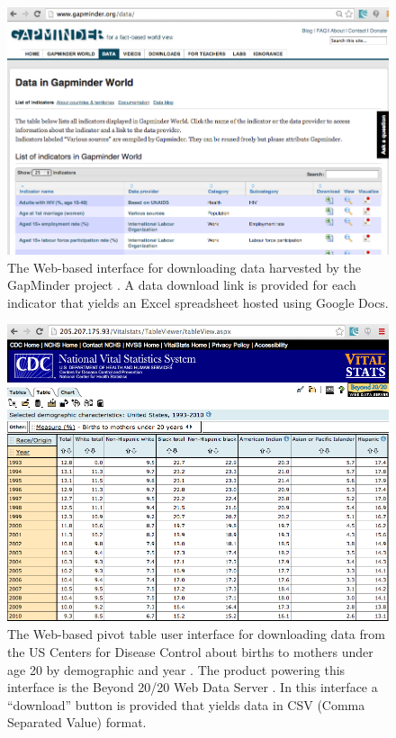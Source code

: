 \begin{figure}[h!]
  \centering
  \includegraphics[width=\figureWidth]{figs/gapminderData.png}
  \caption[GapMinder Data Access User Interface.]
    {The Web-based interface for downloading data harvested by the GapMinder project \cite{gapminderData}. A data download link is provided for each indicator that yields an Excel spreadsheet hosted using Google Docs.}
  \label{fig:gapminderData}
\end{figure}

\begin{figure}[h!]
  \centering
  \includegraphics[width=\figureWidth]{figs/CDCVitalStatsUI.png}
  \caption[CDC Vital Statistics User Interface.]
    {The Web-based pivot table user interface for downloading data from the US Centers for Disease Control about births to mothers under age 20 by demographic and year \cite{CDCVitalStatsUI}. The product powering this interface is the Beyond 20/20 Web Data Server \cite{beyond2020webDataServer}. In this interface a ``download'' button is provided that yields data in CSV (Comma Separated Value) format.}
  \label{fig:CDCVitalStatsUI}
\end{figure}

